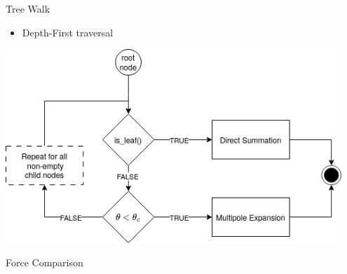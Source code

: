 \begin{frame}{Tree Walk}
	\begin{itemize}
		\item Depth-First traversal
	\end{itemize}
	\includegraphics[width=0.95\textwidth]{figures/multipole_uml.png}
\end{frame}

\begin{frame}{Force Comparison}

\end{frame}

